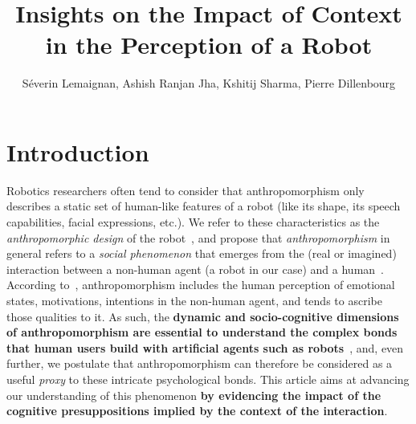 \documentclass[lettersize, noapacite, twoside, HRI]{apa_HRI}
\title{Insights on the Impact of Context in the Perception of a Robot}
\author{S\'everin Lemaignan, Ashish Ranjan Jha, Kshitij Sharma, Pierre
Dillenbourg}
\affiliation{CHILI Lab, \'Ecole Polytechnique F\'ed\'erale de Lausanne}
\begin{document}
\maketitle

\section{Introduction}

Robotics researchers often tend to consider that anthropomorphism only describes
a static set of human-like features of a robot (like its shape, its speech
capabilities, facial expressions, etc.). We refer to these characteristics as
the \emph{anthropomorphic design} of the
robot~\cite{fink_anthropomorphism_2012}, and propose that
\emph{anthropomorphism} in general refers to a \emph{social phenomenon} that
emerges from the (real or imagined) interaction between a non-human agent (a
robot in our case) and a human~\cite{persson_anthropomorphism_2000}.  According
to~\cite{epley_when_2008}, anthropomorphism includes the human perception of
emotional states, motivations, intentions in the non-human agent, and tends to
ascribe those qualities to it. As such, the \textbf{dynamic and socio-cognitive
dimensions of anthropomorphism are essential to understand the complex bonds
that human users build with artificial agents such as
robots}~\cite{lemaignan2014dynamics}, and, even further, we postulate that
anthropomorphism can therefore be considered as a useful \emph{proxy} to these
intricate psychological bonds. This article aims at advancing our understanding
of this phenomenon \textbf{by evidencing the impact of the cognitive
presuppositions implied by the context of the interaction}.
\end{document}
